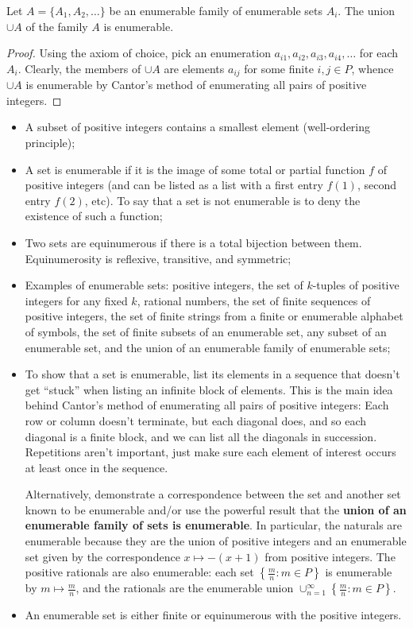 \begin{exercise}[1.7]
  Let $A = \{A_1, A_2, \ldots\}$ be an enumerable family of enumerable sets $A_i$.
  The union $\cup A$ of the family $A$ is enumerable.
\end{exercise}
\begin{proof}
  Using the axiom of choice, pick an enumeration $a_{i1}, a_{i2}, a_{i3}, a_{i4}, \ldots$ for each $A_i$.
  Clearly, the members of $\cup A$ are elements $a_{ij}$ for some finite $i,j \in P$, whence $\cup A$ is enumerable by Cantor's method of enumerating all pairs of positive integers.
\end{proof}

\begin{summary}
  \begin{itemize}
    \item A subset of positive integers contains a smallest element (well-ordering principle);
    \item A set is enumerable if it is the image of some total or partial function $f$ of positive integers (and can be listed as a list with a first entry $f(1)$, second entry $f(2)$, etc).
    To say that a set is not enumerable is to deny the existence of such a function;
    \item Two sets are equinumerous if there is a total bijection between them. Equinumerosity is reflexive, transitive, and symmetric;
    \item Examples of enumerable sets: positive integers, the set of $k$-tuples of positive integers for any fixed $k$, rational numbers, the set of finite sequences of positive integers, the set of finite strings from a finite or enumerable alphabet of symbols, the set of finite subsets of an enumerable set, any subset of an enumerable set, and the union of an enumerable family of enumerable sets;
    \item To show that a set is enumerable, list its elements in a sequence that doesn't get ``stuck'' when listing an infinite block of elements.
    This is the main idea behind Cantor's method of enumerating all pairs of positive integers: Each row or column doesn't terminate, but each diagonal does, and so each diagonal is a finite block, and we can list all the diagonals in succession.
    Repetitions aren't important, just make sure each element of interest occurs at least once in the sequence.

    Alternatively, demonstrate a correspondence between the set and another set known to be enumerable and/or use the powerful result that the \textbf{union of an enumerable family of sets is enumerable}.
    In particular, the naturals are enumerable because they are the union of positive integers and an enumerable set given by the correspondence $x \mapsto -(x+1)$ from positive integers.
    The positive rationals are also enumerable: each set $\left\{\frac{m}{n} : m \in P\right\}$ is enumerable by $m \mapsto \frac{m}{n}$, and the rationals are the enumerable union $\cup_{n=1}^\infty \left\{\frac{m}{n} : m \in P\right\}$.
    \item An enumerable set is either finite or equinumerous with the positive integers.
  \end{itemize}
\end{summary}
